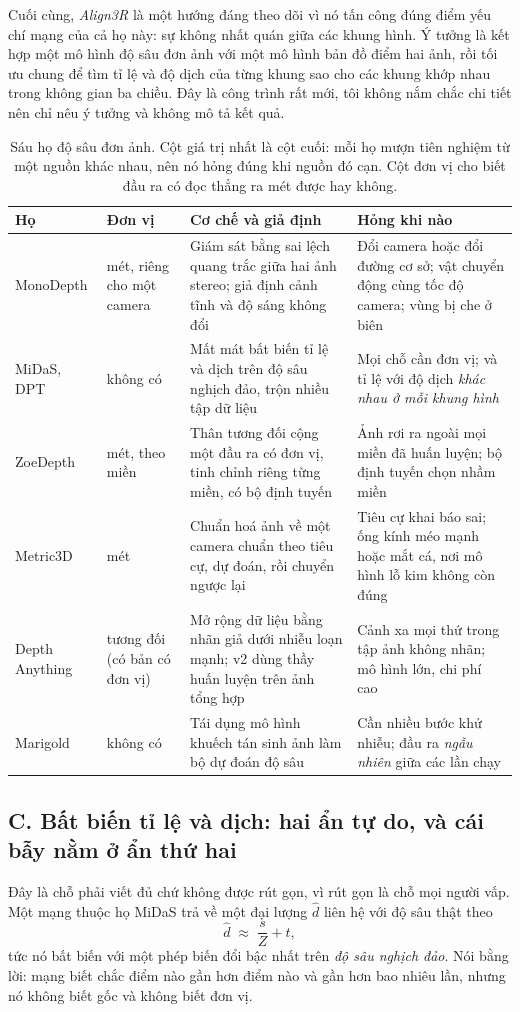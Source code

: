 \documentclass[../../deep_learning.tex]{subfiles}
\begin{document}
Cuối cùng, \emph{Align3R} là một hướng đáng theo dõi vì nó tấn công đúng điểm yếu chí mạng của cả họ này: sự không nhất quán giữa các khung hình. Ý tưởng là kết hợp một mô hình độ sâu đơn ảnh với một mô hình bản đồ điểm hai ảnh, rồi tối ưu chung để tìm tỉ lệ và độ dịch của từng khung sao cho các khung khớp nhau trong không gian ba chiều. Đây là công trình rất mới, tôi không nắm chắc chi tiết nên chỉ nêu ý tưởng và không mô tả kết quả.

\begin{table}[H]\centering\footnotesize
\caption{Sáu họ độ sâu đơn ảnh. Cột giá trị nhất là cột cuối: mỗi họ mượn tiên nghiệm từ một nguồn khác nhau, nên nó hỏng đúng khi nguồn đó cạn. Cột đơn vị cho biết đầu ra có đọc thẳng ra mét được hay không.}
\label{tab:f30-depth}
\begin{tabularx}{\linewidth}{@{}L{1.85cm}L{1.5cm}YL{3.5cm}@{}}
\toprule
\textbf{Họ} & \textbf{Đơn vị} & \textbf{Cơ chế và giả định} & \textbf{Hỏng khi nào}\\
\midrule
MonoDepth & mét, riêng cho một camera & Giám sát bằng sai lệch quang trắc giữa hai ảnh stereo; giả định cảnh tĩnh và độ sáng không đổi & Đổi camera hoặc đổi đường cơ sở; vật chuyển động cùng tốc độ camera; vùng bị che ở biên\\
MiDaS, DPT & không có & Mất mát bất biến tỉ lệ và dịch trên độ sâu nghịch đảo, trộn nhiều tập dữ liệu & Mọi chỗ cần đơn vị; và tỉ lệ với độ dịch \emph{khác nhau ở mỗi khung hình}\\
ZoeDepth & mét, theo miền & Thân tương đối cộng một đầu ra có đơn vị, tinh chỉnh riêng từng miền, có bộ định tuyến & Ảnh rơi ra ngoài mọi miền đã huấn luyện; bộ định tuyến chọn nhầm miền\\
Metric3D & mét & Chuẩn hoá ảnh về một camera chuẩn theo tiêu cự, dự đoán, rồi chuyển ngược lại & Tiêu cự khai báo sai; ống kính méo mạnh hoặc mắt cá, nơi mô hình lỗ kim không còn đúng\\
Depth Anything & tương đối (có bản có đơn vị) & Mở rộng dữ liệu bằng nhãn giả dưới nhiễu loạn mạnh; v2 dùng thầy huấn luyện trên ảnh tổng hợp & Cảnh xa mọi thứ trong tập ảnh không nhãn; mô hình lớn, chi phí cao\\
Marigold & không có & Tái dụng mô hình khuếch tán sinh ảnh làm bộ dự đoán độ sâu & Cần nhiều bước khử nhiễu; đầu ra \emph{ngẫu nhiên} giữa các lần chạy\\
\bottomrule
\end{tabularx}
\end{table}

\subsection{C. Bất biến tỉ lệ và dịch: hai ẩn tự do, và cái bẫy nằm ở ẩn thứ hai}
Đây là chỗ phải viết đủ chứ không được rút gọn, vì rút gọn là chỗ mọi người vấp. Một mạng thuộc họ MiDaS trả về một đại lượng \(\hat{d}\) liên hệ với độ sâu thật theo
\[
\hat{d} \;\approx\; \frac{s}{Z} + t ,
\]
tức nó bất biến với một phép biến đổi bậc nhất trên \emph{độ sâu nghịch đảo}. Nói bằng lời: mạng biết chắc điểm nào gần hơn điểm nào và gần hơn bao nhiêu lần, nhưng nó không biết gốc và không biết đơn vị.
\end{document}
